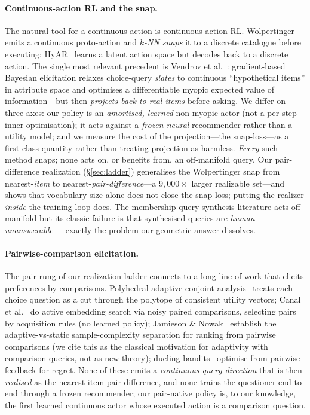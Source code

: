 \documentclass[11pt]{article}
\begin{document}
\paragraph{Continuous-action RL and the snap.} The natural tool for a continuous action is continuous-action RL.
Wolpertinger~\cite{wolpertinger} emits a continuous proto-action and \emph{$k$-NN snaps} it to a discrete catalogue
before executing; HyAR~\cite{hyar} learns a latent action space but decodes back to a discrete action. The single most
relevant precedent is Vendrov et al.~\cite{vendrov20}: gradient-based Bayesian elicitation relaxes choice-query
\emph{slates} to continuous ``hypothetical items'' in attribute space and optimises a differentiable myopic expected
value of information---but then \emph{projects back to real items} before asking. We differ on three axes: our policy
is an \emph{amortised, learned} non-myopic actor (not a per-step inner optimisation); it acts against a \emph{frozen
neural} recommender rather than a utility model; and we measure the cost of the projection---the snap-loss---as a
first-class quantity rather than treating projection as harmless. \emph{Every} such method snaps; none acts on,
or benefits from, an off-manifold query. Our pair-difference realization (\S\ref{sec:ladder}) generalises the
Wolpertinger snap from nearest-\emph{item} to nearest-\emph{pair-difference}---a $9{,}000\times$ larger realizable
set---and shows that vocabulary size alone does not close the snap-loss; putting the realizer \emph{inside} the
training loop does. The membership-query-synthesis literature acts off-manifold but its classic
failure is that synthesised queries are \emph{human-unanswerable}~\cite{baum92}---exactly the problem our geometric
answer dissolves.

\paragraph{Pairwise-comparison elicitation.} The pair rung of our realization ladder connects to a long line of work
that elicits preferences by comparisons. Polyhedral adaptive conjoint analysis~\cite{toubia04} treats each choice
question as a cut through the polytope of consistent utility vectors; Canal et al.~\cite{canal19} do active embedding
search via noisy paired comparisons, selecting pairs by acquisition rules (no learned policy); Jamieson \&
Nowak~\cite{jamieson11} establish the adaptive-vs-static sample-complexity separation for ranking from pairwise
comparisons (we cite this as the classical motivation for adaptivity with comparison queries, not as new theory);
dueling bandits~\cite{yue09duel} optimise from pairwise feedback for regret. None of these emits a \emph{continuous
query direction} that is then \emph{realised} as the nearest item-pair difference, and none trains the questioner
end-to-end through a frozen recommender; our pair-native policy is, to our knowledge, the first learned continuous
actor whose executed action is a comparison question.
\end{document}
